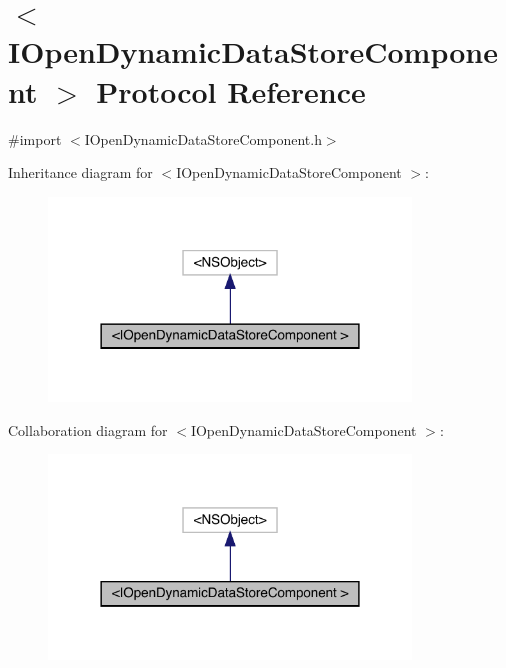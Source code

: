 \hypertarget{protocol_i_open_dynamic_data_store_component_01-p}{}\section{$<$I\+Open\+Dynamic\+Data\+Store\+Component $>$ Protocol Reference}
\label{protocol_i_open_dynamic_data_store_component_01-p}


{\ttfamily \#import $<$I\+Open\+Dynamic\+Data\+Store\+Component.\+h$>$}



Inheritance diagram for $<$I\+Open\+Dynamic\+Data\+Store\+Component $>$\+:\nopagebreak
\begin{figure}[H]
\begin{center}
\leavevmode
\includegraphics[width=273pt]{protocol_i_open_dynamic_data_store_component_01-p__inherit__graph}
\end{center}
\end{figure}


Collaboration diagram for $<$I\+Open\+Dynamic\+Data\+Store\+Component $>$\+:\nopagebreak
\begin{figure}[H]
\begin{center}
\leavevmode
\includegraphics[width=273pt]{protocol_i_open_dynamic_data_store_component_01-p__coll__graph}
\end{center}
\end{figure}
